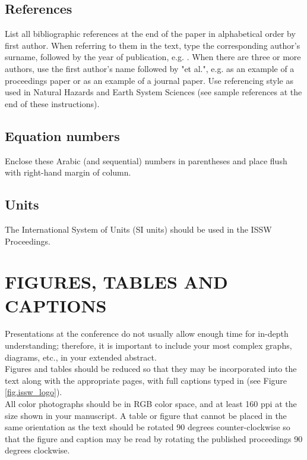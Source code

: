 \documentclass[3p,authoryear,times,twocolumn]{elsarticle_issw2018}
\begin{document}
\subsection{References}
List all bibliographic references at the end of the paper in alphabetical order by first author. When referring to them in the text, type the corresponding author's surname, followed by the year of publication, e.g. \cite{McClung2006}. When there are three or more authors, use the first author's name followed by "et al.", e.g. \cite{Greene2006} as an example of a proceedings paper or \cite{Fisher2022} as an example of a journal paper. Use referencing style as used in Natural Hazards and Earth System Sciences (see sample references at the end of these instructions).

%
\subsection{Equation numbers}
Enclose these Arabic (and sequential) numbers in parentheses and place flush with right-hand margin of column.
%
\subsection{Units}
The International System of Units (SI units) should be used in the ISSW Proceedings.
%
\section{FIGURES, TABLES AND CAPTIONS}
Presentations at the conference do not usually allow enough time for in-depth understanding; therefore, it is important to include your most complex graphs, diagrams, etc., in your extended abstract.\\
%

\noindent
Figures and tables should be reduced so that they may be incorporated into the text along with the appropriate pages, with full captions typed in (see Figure \ref{fig.issw_logo}).\\

\noindent
All color photographs should be in RGB color space, and at least 160 ppi at the size shown in your manuscript. A table or figure that cannot be placed in the same orientation as the text should be rotated 90 degrees counter-clockwise so that the figure and caption may be read by rotating the published proceedings 90 degrees clockwise. \\
\end{document}
